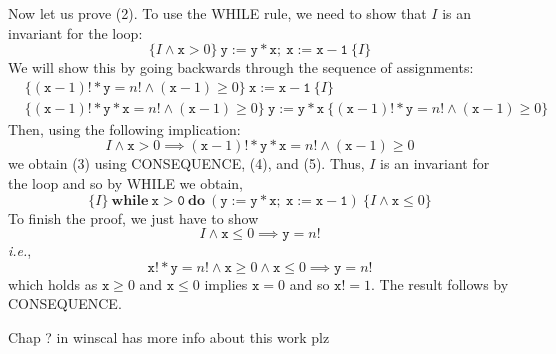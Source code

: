 Now let us prove (2). To use the WHILE rule, we need to show that $I$ is an invariant for the
loop:
\begin{equation}
\{I \wedge \mathtt{x} > 0\}\ \mathtt{y := y * x;\ x := x - 1}\ \{I\}
\end{equation}
We will show this by going backwards through the sequence of assignments:
\begin{align}
&\{(\mathtt{x} - 1)! * \mathtt{y} = n! \wedge (\mathtt{x} - 1) \geq 0\}\ \mathtt{x := x - 1}\
\{I\} \\
&\{(\mathtt{x} - 1)! * \mathtt{y} * \mathtt{x} = n! \wedge (\mathtt{x} - 1) \geq 0\}\
\mathtt{y := y * x}\ \{(\mathtt{x} - 1)! * \mathtt{y} = n! \wedge (\mathtt{x} - 1) \geq 0\}
\end{align}
Then, using the following implication:
\[
I \wedge \mathtt{x} > 0 \implies (\mathtt{x} - 1)! * \mathtt{y} * \mathtt{x} = n! \wedge
(\mathtt{x} - 1) \geq 0
\]
we obtain (3) using CONSEQUENCE, (4), and (5). Thus, $I$ is an invariant for the loop and so by
WHILE we obtain,
\[
\{I\}\ \mathbf{while}\ \mathtt{x > 0}\ \mathbf{do}\ (\mathtt{y := y * x;\ x := x - 1})\ \{I
\wedge \mathtt{x} \leq 0\}
\]
To finish the proof, we just have to show
\[
I \wedge \mathtt{x} \leq 0 \implies \mathtt{y} = n!
\]
\emph{i.e.},
\[
\mathtt{x}! * \mathtt{y} = n! \wedge \mathtt{x} \geq 0 \wedge \mathtt{x} \leq 0 \implies
\mathtt{y} = n!
\]
which holds as $\mathtt{x} \geq 0$ and $\mathtt{x} \leq 0$ implies $\mathtt{x} = 0$ and so
$\mathtt{x}! = 1$. The result follows by CONSEQUENCE.

Chap ? in winscal has more info about this
work plz

% 
